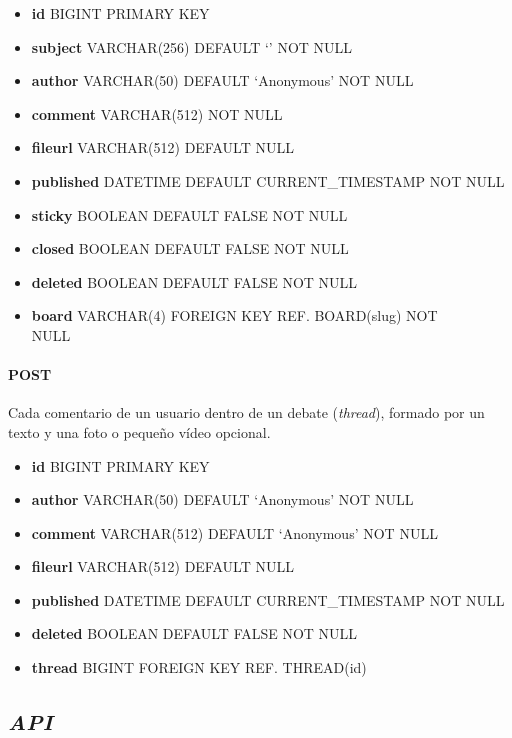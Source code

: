 \documentclass[12pt,a4paper,titlepage]{article}
\begin{document}
    \begin{itemize}
        \item \textbf{id} BIGINT PRIMARY KEY
        \item \textbf{subject} VARCHAR(256) DEFAULT `' NOT NULL
        \item \textbf{author} VARCHAR(50) DEFAULT `Anonymous' NOT NULL
        \item \textbf{comment} VARCHAR(512) NOT NULL
        \item \textbf{fileurl} VARCHAR(512) DEFAULT NULL
        \item \textbf{published} DATETIME DEFAULT CURRENT\_TIMESTAMP NOT NULL
        \item \textbf{sticky} BOOLEAN DEFAULT FALSE NOT NULL
        \item \textbf{closed} BOOLEAN DEFAULT FALSE NOT NULL
        \item \textbf{deleted} BOOLEAN DEFAULT FALSE NOT NULL
        \item \textbf{board} VARCHAR(4) FOREIGN KEY REF. BOARD(slug) NOT\\NULL
    \end{itemize}

    \paragraph{POST} Cada comentario de un usuario dentro de un debate (\textit{thread}), formado por un texto y una foto o pequeño vídeo opcional.

    \begin{itemize}
        \item \textbf{id} BIGINT PRIMARY KEY
        \item \textbf{author} VARCHAR(50) DEFAULT `Anonymous' NOT NULL
        \item \textbf{comment} VARCHAR(512) DEFAULT `Anonymous' NOT NULL
        \item \textbf{fileurl} VARCHAR(512) DEFAULT NULL
        \item \textbf{published} DATETIME DEFAULT CURRENT\_TIMESTAMP NOT NULL
        \item \textbf{deleted} BOOLEAN DEFAULT FALSE NOT NULL
        \item \textbf{thread} BIGINT FOREIGN KEY REF. THREAD(id)
    \end{itemize}

    \subsection{\textit{API}}
\end{document}
